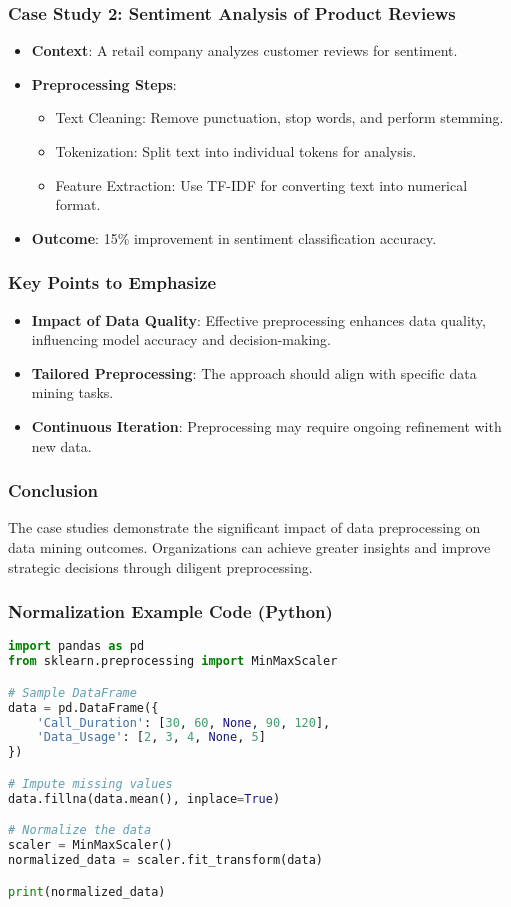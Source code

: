 \documentclass{beamer}
\begin{document}
\begin{frame}[fragile]
    \frametitle{Case Study 2: Sentiment Analysis of Product Reviews}
    \begin{itemize}
        \item \textbf{Context}: A retail company analyzes customer reviews for sentiment.
        \item \textbf{Preprocessing Steps}:
        \begin{itemize}
            \item Text Cleaning: Remove punctuation, stop words, and perform stemming.
            \item Tokenization: Split text into individual tokens for analysis.
            \item Feature Extraction: Use TF-IDF for converting text into numerical format.
        \end{itemize}
        \item \textbf{Outcome}: 15\% improvement in sentiment classification accuracy.
    \end{itemize}
\end{frame}

\begin{frame}[fragile]
    \frametitle{Key Points to Emphasize}
    \begin{itemize}
        \item \textbf{Impact of Data Quality}: Effective preprocessing enhances data quality, influencing model accuracy and decision-making.
        \item \textbf{Tailored Preprocessing}: The approach should align with specific data mining tasks.
        \item \textbf{Continuous Iteration}: Preprocessing may require ongoing refinement with new data.
    \end{itemize}
\end{frame}

\begin{frame}[fragile]
    \frametitle{Conclusion}
    The case studies demonstrate the significant impact of data preprocessing on data mining outcomes. Organizations can achieve greater insights and improve strategic decisions through diligent preprocessing.
\end{frame}

\begin{frame}[fragile]
    \frametitle{Normalization Example Code (Python)}
    \begin{lstlisting}[language=Python]
import pandas as pd
from sklearn.preprocessing import MinMaxScaler

# Sample DataFrame
data = pd.DataFrame({
    'Call_Duration': [30, 60, None, 90, 120],
    'Data_Usage': [2, 3, 4, None, 5]
})

# Impute missing values
data.fillna(data.mean(), inplace=True)

# Normalize the data
scaler = MinMaxScaler()
normalized_data = scaler.fit_transform(data)

print(normalized_data)
    \end{lstlisting}
\end{frame}
\end{document}
